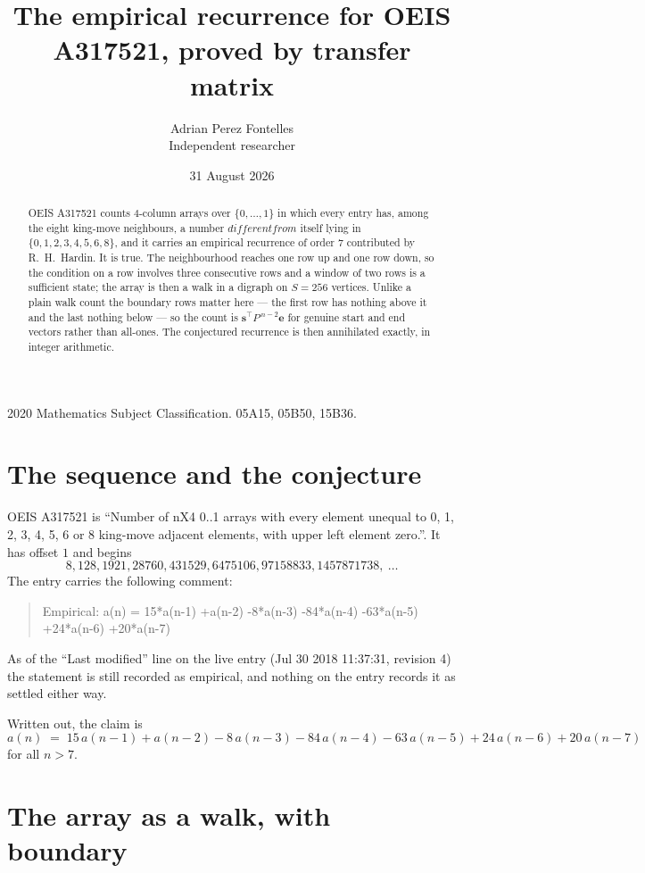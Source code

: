 \documentclass[11pt,a4paper]{article}
\title{The empirical recurrence for OEIS A317521, proved by transfer matrix}
\author{Adrian Perez Fontelles\\ \small Independent researcher}
\date{31 August 2026}
\theoremstyle{plain}
\theoremstyle{definition}
\begin{document}
\maketitle

\begin{abstract}
OEIS A317521 counts $4$-column arrays over $\{0,\dots,1\}$ in which every entry has,
among the eight king-move neighbours, a number $different from$ itself lying in $\{0,1,2,3,4,5,6,8\}$, and it carries an empirical
recurrence of order $7$ contributed by R.~H.~Hardin. It is true. The neighbourhood
reaches one row up and one row down, so the condition on a row involves three consecutive
rows and a window of two rows is a sufficient state; the array is then a walk in a digraph
on $S=256$ vertices. Unlike a plain walk count the boundary rows matter here --- the first
row has nothing above it and the last nothing below --- so the count is
$\mathbf{s}^{\!\top}P^{\,n-2}\mathbf{e}$ for genuine start and end vectors rather than
all-ones. The conjectured recurrence is then annihilated exactly, in integer arithmetic.
\end{abstract}

\noindent\small 2020 Mathematics Subject Classification. 05A15, 05B50, 15B36.\normalsize

\section{The sequence and the conjecture}

OEIS A317521 is ``Number of nX4 0..1 arrays with every element unequal to 0, 1, 2, 3, 4, 5, 6 or 8 king-move adjacent elements, with upper left element zero.''. It has offset
$1$ and begins
\[
8, 128, 1921, 28760, 431529, 6475106, 97158833, 1457871738,\ \dots
\]
The entry carries the following comment:
\begin{quote}\small
Empirical: a(n) = 15*a(n-1) +a(n-2) -8*a(n-3) -84*a(n-4) -63*a(n-5) +24*a(n-6) +20*a(n-7)
\end{quote}
As of the ``Last modified'' line on the live entry (Jul 30 2018 11:37:31, revision
4) the statement is still recorded as empirical, and nothing on the entry
records it as settled either way.

Written out, the claim is
\begin{equation}\label{eq:conj}
a(n)\;=\;15\,a(n-1) + a(n-2) - 8\,a(n-3) - 84\,a(n-4) - 63\,a(n-5) + 24\,a(n-6) + 20\,a(n-7)
\end{equation}
for all $n>7$.

\section{The array as a walk, with boundary}
\end{document}
